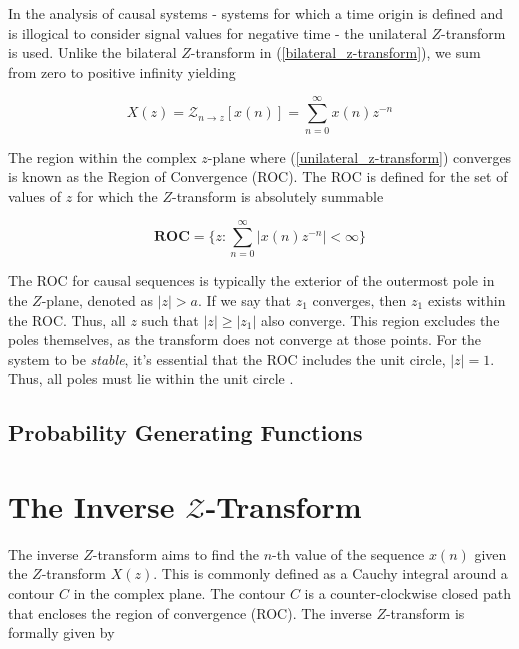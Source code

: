\documentclass[a4paper]{report}
\begin{document}
In the analysis of causal systems - systems for which a time origin is defined and is illogical to consider signal values for negative time - the unilateral $Z$-transform is used. Unlike the bilateral $Z$-transform in (\ref{bilateral_z-transform}), we sum from zero to positive infinity yielding

\begin{equation}\label{unilateral_z-transform}
	X(z) = \mathcal{Z}_{n \rightarrow z}[x(n)] = \sum^{\infty}_{n = 0} x(n)z^{-n}
\end{equation}

The region within the complex $z$-plane where (\ref{unilateral_z-transform}) converges is known as the Region of Convergence (ROC). The ROC is defined for the set of values of $z$ for which the $Z$-transform is absolutely summable

\begin{equation}\label{roc}
	\textbf{ROC} = \Biggl\{ z : \sum^{\infty}_{n = 0} |x(n)z^{-n}| < \infty \Biggr\}
\end{equation}

The ROC for causal sequences is typically the exterior of the outermost pole in the $Z$-plane, denoted as $|z| > a$. If we say that $z_1$ converges, then $z_1$ exists within the ROC. Thus, all $z$ such that $|z| \geq |z_1|$ also converge. This region excludes the poles themselves, as the transform does not converge at those points. For the system to be \textit{stable}, it's essential that the ROC includes the unit circle, $|z| = 1$. Thus, all poles must lie within the unit circle \citep{LovelessGuido2021}.

\subsection{Probability Generating Functions}\label{pgfs}


\section{The Inverse \texorpdfstring{$\mathcal{Z}$}{Lg}-Transform}

The inverse $Z$-transform aims to find the $n$-th value of the sequence $x(n)$ given the $Z$-transform $X(z)$. This is commonly defined as a Cauchy integral around a contour $C$ in the complex plane. The contour $C$ is a counter-clockwise closed path that encloses the region of convergence (ROC). The inverse $Z$-transform is formally given by
\end{document}
